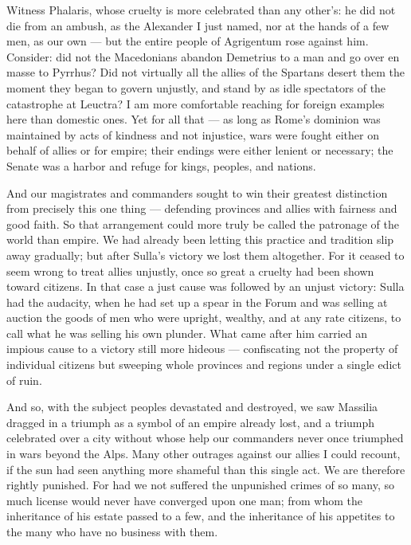  Witness Phalaris, whose cruelty is more celebrated than any other's: he did not die from an ambush, as the Alexander I just named, nor at the hands of a few men, as our own — but the entire people of Agrigentum rose against him. Consider: did not the Macedonians abandon Demetrius to a man and go over en masse to Pyrrhus? Did not virtually all the allies of the Spartans desert them the moment they began to govern unjustly, and stand by as idle spectators of the catastrophe at Leuctra? I am more comfortable reaching for foreign examples here than domestic ones. Yet for all that — as long as Rome's dominion was maintained by acts of kindness and not injustice, wars were fought either on behalf of allies or for empire; their endings were either lenient or necessary; the Senate was a harbor and refuge for kings, peoples, and nations.

 And our magistrates and commanders sought to win their greatest distinction from precisely this one thing — defending provinces and allies with fairness and good faith. So that arrangement could more truly be called the patronage of the world than empire. We had already been letting this practice and tradition slip away gradually; but after Sulla's victory we lost them altogether. For it ceased to seem wrong to treat allies unjustly, once so great a cruelty had been shown toward citizens. In that case a just cause was followed by an unjust victory: Sulla had the audacity, when he had set up a spear in the Forum and was selling at auction the goods of men who were upright, wealthy, and at any rate citizens, to call what he was selling his own plunder. What came after him carried an impious cause to a victory still more hideous — confiscating not the property of individual citizens but sweeping whole provinces and regions under a single edict of ruin.

 And so, with the subject peoples devastated and destroyed, we saw Massilia dragged in a triumph as a symbol of an empire already lost, and a triumph celebrated over a city without whose help our commanders never once triumphed in wars beyond the Alps. Many other outrages against our allies I could recount, if the sun had seen anything more shameful than this single act. We are therefore rightly punished. For had we not suffered the unpunished crimes of so many, so much license would never have converged upon one man; from whom the inheritance of his estate passed to a few, and the inheritance of his appetites to the many who have no business with them.

